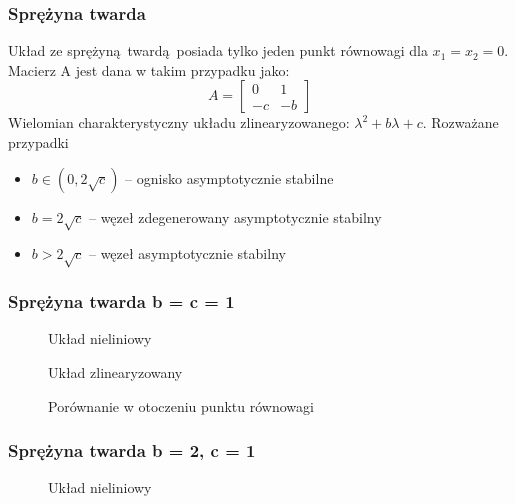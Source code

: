 \documentclass[a4paper, 10pt]{article}
\begin{document}
			\subsubsection{Sprężyna twarda}
				Układ ze sprężyną twardą posiada tylko jeden punkt równowagi dla $x_1 = x_2 = 0$. Macierz A jest dana w takim przypadku jako:
				$$
					A = \begin{bmatrix}
						0 & 1 \\
						-c  & -b
					\end{bmatrix}
				$$
				Wielomian charakterystyczny układu zlinearyzowanego: $\lambda^2 + b \lambda + c$. Rozważane przypadki
				\begin{itemize}
					\item[] $b \in (0, 2\sqrt{c}) $ -- ognisko asymptotycznie stabilne
					\item[] $b = 2 \sqrt{c}$ -- węzeł zdegenerowany asymptotycznie stabilny
					\item[]	$b > 2\sqrt{c}$ -- węzeł asymptotycznie stabilny
				\end{itemize}
				
			\subsubsection{Sprężyna twarda b = c = 1}
				\begin{figure}[H]
					\centering
					\def \svgwidth{0.8\columnwidth}
					
					\caption{Układ nieliniowy}
				\end{figure}\noindent
				
				
				\begin{figure}[H]
					\centering
					\def \svgwidth{0.8\columnwidth}
					
					\caption{Układ zlinearyzowany}
				\end{figure}\noindent
				
				
				\begin{figure}[H]
					\centering
					\def \svgwidth{0.8\columnwidth}
					
					\caption{Porównanie w otoczeniu punktu równowagi}
				\end{figure}\noindent
				
			\subsubsection{Sprężyna twarda b = 2, c = 1}
				\begin{figure}[H]
					\centering
					\def \svgwidth{0.8\columnwidth}
					
					\caption{Układ nieliniowy}
				\end{figure}\noindent
				
\end{document}
